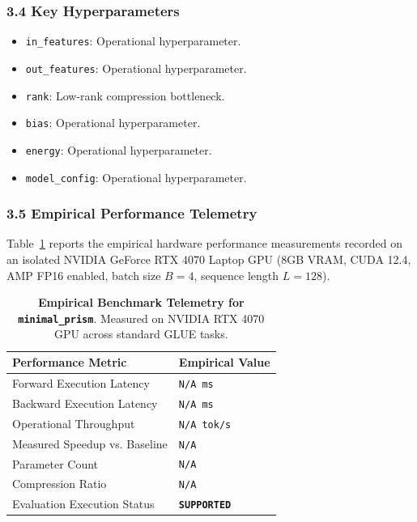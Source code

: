 \subsubsection*{3.4 Key Hyperparameters}
\begin{itemize}
    \item \texttt{in\_features}: Operational hyperparameter.
    \item \texttt{out\_features}: Operational hyperparameter.
    \item \texttt{rank}: Low-rank compression bottleneck.
    \item \texttt{bias}: Operational hyperparameter.
    \item \texttt{energy}: Operational hyperparameter.
    \item \texttt{model\_config}: Operational hyperparameter.
\end{itemize}

\subsubsection*{3.5 Empirical Performance Telemetry}
Table~\ref{tab:telemetry_minimal\_prism} reports the empirical hardware performance measurements recorded on an isolated NVIDIA GeForce RTX 4070 Laptop GPU (8GB VRAM, CUDA 12.4, AMP FP16 enabled, batch size $B=4$, sequence length $L=128$).

\begin{table}[h]
\centering
\small
\caption{\textbf{Empirical Benchmark Telemetry for \texttt{minimal\_prism}}. Measured on NVIDIA RTX 4070 GPU across standard GLUE tasks.}
\label{tab:telemetry_minimal\_prism}
\begin{tabularx}{\columnwidth}{lX}
\toprule
\textbf{Performance Metric} & \textbf{Empirical Value} \\
\midrule
Forward Execution Latency & \texttt{N/A ms} \\
Backward Execution Latency & \texttt{N/A ms} \\
Operational Throughput & \texttt{N/A tok/s} \\
Measured Speedup vs. Baseline & \texttt{N/A} \\
Parameter Count & \texttt{N/A} \\
Compression Ratio & \texttt{N/A} \\
Evaluation Execution Status & \textbf{\texttt{SUPPORTED}} \\
\bottomrule
\end{tabularx}
\end{table}

